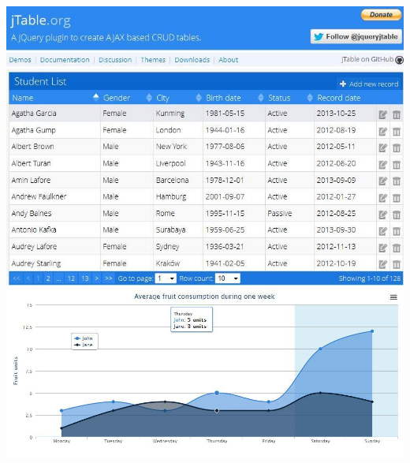 \documentclass[a4paper,12pt,notitlepage]{mwrep}
\begin{document}
\begin{center}	
\vspace{4ex}	
	\includegraphics[scale=0.5]{images/jTable.png} \\
	\includegraphics[scale=0.5]{images/highCharts.png} \\
\vspace{4ex}
\end{center}
\end{document}
